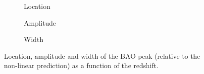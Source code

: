 \begin{figure}
\centering
	\begin{subfigure}{\textwidth}
	\end{subfigure}
	\begin{subfigure}{\textwidth}
		\centering
		\caption{Location}
	\end{subfigure}
	\begin{subfigure}{\textwidth}
		\centering
		\caption{Amplitude}
	\end{subfigure}
	\begin{subfigure}{\textwidth}
		\centering
		\caption{Width}
	\end{subfigure}
	\caption{Location, amplitude and width of the BAO peak (relative to the non-linear prediction) as a function of the redshift.}
	\label{fig:corr_peak}
\end{figure}